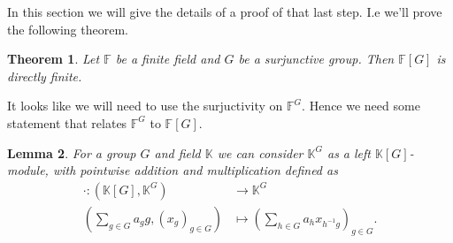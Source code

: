 \documentclass[titlepage, a4paper]{article}
\newcommand{\F}{\mathbb{F}}
\newtheorem{theorem}{Theorem}[section]
\newtheorem{lemma}[theorem]{Lemma}
\theoremstyle{remark}
\begin{document}
	In this section we will give the details of a proof of that last step. 
	I.e we'll prove the following theorem. 
	\begin{theorem}\label{thm:gottschalk_kaplansky}
		Let $\F$ be a finite field and $G$ be a surjunctive group. Then $\F[G]$ is directly finite. 
	\end{theorem}
	It looks like we will need to use the surjuctivity on $\F^{G}$. Hence we need some statement that relates $\F^{G}$ to $\F[G]$.
	\begin{lemma}
		For a group $G$ and field $\mathbb K$ we can consider $\mathbb{K}^{G}$ as a left $\mathbb{K}[G]$-module, with pointwise addition and multiplication defined as
		\begin{align*}
			\cdot : (\mathbb{K}[G] , \mathbb{K}^{G}) &\longrightarrow \mathbb{K}^{G} \\
		\left( \sum_{g \in G} a_g g,  (x_g)_{g \in G}\right)  &\longmapsto \left( \sum_{h \in G} a_h x_{h^{-1}g} \right)_{g \in G}
	.\end{align*} 
	\end{lemma}
\end{document}
